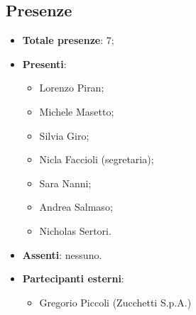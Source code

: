 \documentclass[11pt]{article}
\begin{document}
	\subsection{Presenze}
	\begin{itemize}
		\item \textbf{Totale presenze}: 7;
		\item \textbf{Presenti}:
		\begin{itemize}
			\item Lorenzo Piran; 
			\item Michele Masetto;
			\item Silvia Giro;
			\item Nicla Faccioli (segretaria);
			\item Sara Nanni;
			\item Andrea Salmaso;
			\item Nicholas Sertori.
		\end{itemize}
		\item \textbf{Assenti}: nessuno.
		\item \textbf{Partecipanti esterni}: 
			\begin{itemize}
				\item Gregorio Piccoli (Zucchetti S.p.A.)
			\end{itemize}
	\end{itemize}

	\newpage
\end{document}
